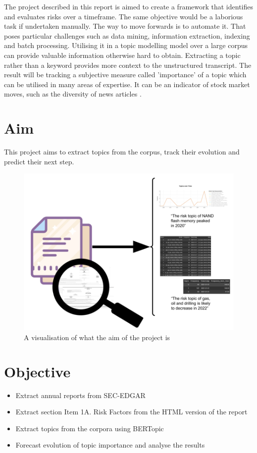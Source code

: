 \documentclass[12pt,MSc,a4paper,oneside]{muthesis}
\begin{document}
The project described in this report is aimed to create a framework that identifies and evaluates risks over a timeframe. The same objective would be a laborious task if undertaken manually. The way to move forwards is to automate it. That poses particular challenges such as data mining, information extraction, indexing and batch processing. Utilising it in a topic modelling model over a large corpus can provide valuable information otherwise hard to obtain.
Extracting a topic rather than a keyword provides more context to the unstructured transcript. The result will be tracking a subjective measure called 'importance' of a topic which can be utilised in many areas of expertise. It can be an indicator of stock market moves, such as the diversity of news articles \citep{curme_zhuo_moat_preis_2017}.

\section{Aim}
This project aims to extract topics from the corpus, track their evolution and predict their next step.
\begin{figure}[h]
  \centering
  \includegraphics{images/abstract/Aim_image.png}
  \caption{A visualisation of what the aim of the project is}
\end{figure}

\section{Objective}
\begin{itemize}
  \item Extract annual reports from SEC-EDGAR
  \item Extract section Item 1A. Risk Factors from the HTML version of the report
  \item Extract topics from the corpora using BERTopic
  \item Forecast evolution of topic importance and analyse the results
\end{itemize}
\end{document}
